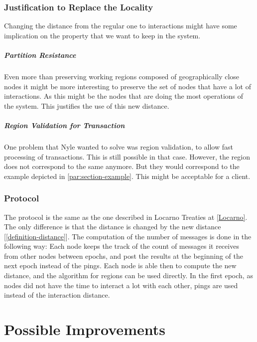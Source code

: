 \documentclass[a4paper,11pt,oneside]{report}
\begin{document}
\subsection{Justification to Replace the Locality}
Changing the distance from the regular one to interactions might have some
implication on the property that we want to keep in the system. 

\paragraph{Partition Resistance}
Even more than preserving working regions
composed of geographically close nodes it might be more interesting to preserve
the set of nodes that have a lot of interactions. As this might be the nodes
that are doing the most operations of the system. This justifies the use of
this new distance.

\paragraph{Region Validation for Transaction}
One problem that Nyle wanted to solve was region validation, to allow fast
processing of transactions. This is still possible in that case. However, the
region does not correspond to the same anymore. But they would correspond to
the example depicted in \autoref{par:section-example}. This might be acceptable
for a client. 

\subsection{Protocol}
The protocol is the same as the one described in Locarno Treaties at
\autoref{Locarno}. The only difference is that the distance is changed by the
new distance [\autoref{definition-distance}]. The computation of the number of
messages is done in the following way: Each node keeps the track of the count
of messages it receives from other nodes between epochs, and post the results
at the beginning of the next epoch instead of the pings. Each node is able then
to compute the new distance, and the algorithm for regions can be used
directly. In the first epoch, as nodes did not have the time to interact a lot
with each other, pings are used instead of the interaction distance.


\chapter{Possible Improvements} \label{chap:Possible Improvements} %
\end{document}
